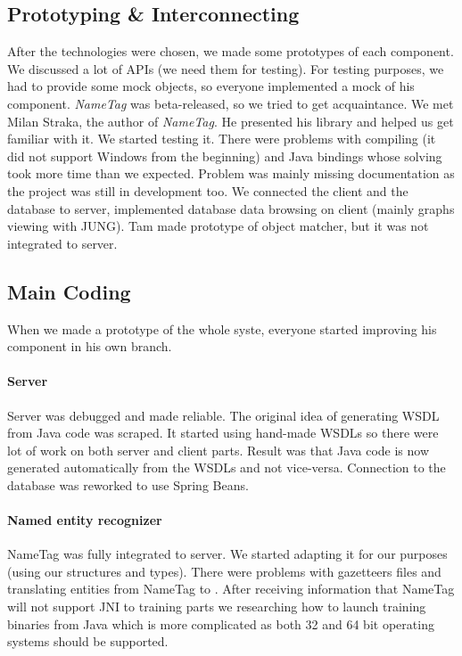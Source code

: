 \subsection{Prototyping \& Interconnecting}
After the technologies were chosen, we made some prototypes of each component.
We discussed a lot of APIs (we need them for testing). For testing purposes, we
had to provide some mock objects, so everyone implemented a mock of his
component. \emph{NameTag} was beta-released, so we tried to get acquaintance. We
met Milan Straka, the author of \emph{NameTag}. He presented his library and
helped us get familiar with it. We started testing it. There were problems with
compiling (it did not support Windows from the beginning) and Java bindings
whose solving took more time than we expected. Problem was mainly missing
documentation as the project was still in development too. We connected the
client and the database to server, implemented database data browsing on client
(mainly graphs viewing with JUNG). Tam made prototype of object matcher, but it
was not integrated to server.

\subsection{Main Coding}
When we made a prototype of the whole syste, everyone started improving his
component in his own branch.

\paragraph{Server} Server was debugged and made reliable. The original idea of
generating WSDL from Java code was scraped. It started using hand-made WSDLs 
so there were lot of work on both server and client parts. Result was that Java
code is now generated automatically from the WSDLs and not vice-versa.
Connection to the database was reworked to use Spring Beans.

\paragraph{Named entity recognizer} NameTag was fully integrated to server. We 
started adapting it for our purposes (using our structures and types). There
were problems with gazetteers files and translating entities from NameTag to
\textan{}. After receiving information that NameTag will not support JNI to
training parts we researching how to launch training binaries from Java which
is more complicated as both 32 and 64 bit operating systems should be supported.


